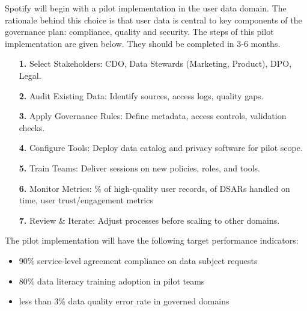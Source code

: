 \documentclass[11pt,a4paper,computermodern]{article}
\begin{document}
Spotify will begin with a pilot implementation in the user data domain. The rationale behind this choice is that user data is central to key components of the governance plan: compliance, quality and security. The steps of this pilot implementation are given below. They should be completed in 3-6 months.
\begin{itemize}[itemsep=5pt, parsep=0pt]
	\item[\textbf{1.}] Select Stakeholders: CDO, Data Stewards (Marketing, Product), DPO, Legal.
	\item[\textbf{2.}] Audit Existing Data: Identify sources, access logs, quality gaps.
	\item[\textbf{3.}] Apply Governance Rules: Define metadata, access controls, validation checks.
	\item[\textbf{4.}] Configure Tools: Deploy data catalog and privacy software for pilot scope.
	\item[\textbf{5.}] Train Teams: Deliver sessions on new policies, roles, and tools.
	\item[\textbf{6.}] Monitor Metrics: \% of high-quality user records, of DSARs handled on time, user trust/engagement metrics
	\item[\textbf{7.}] Review \& Iterate: Adjust processes before scaling to other domains.
\end{itemize}

The pilot implementation will have the following target performance indicators:
\begin{itemize}[itemsep=5pt, parsep=0pt]
	\item 90\% service-level agreement compliance on data subject requests
	\item 80\% data literacy training adoption in pilot teams
	\item less than 3\% data quality error rate in governed domains
\end{itemize}
\end{document}
